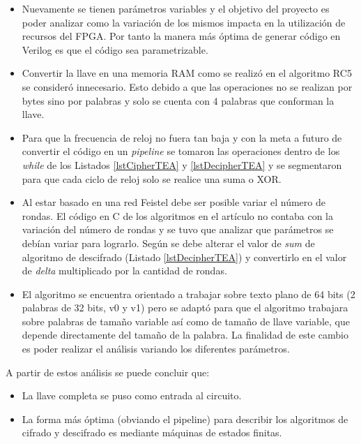 \begin{itemize}
\item Nuevamente se tienen parámetros variables y el objetivo del proyecto es poder analizar como la variación de los mismos impacta en la utilización de recursos del FPGA. Por tanto la manera más óptima de generar código en Verilog es que el código sea parametrizable.


\item Convertir la llave en una memoria RAM como se realizó en el algoritmo RC5 se consideró innecesario. Esto debido a que las operaciones no se realizan por bytes sino por palabras y solo se cuenta con 4 palabras que conforman la llave.

\item Para que la frecuencia de reloj no fuera tan baja y con la meta a futuro de convertir el código en un \textit{pipeline} se tomaron las operaciones dentro de los \textit{while} de los Listados \ref{lstCipherTEA} y \ref{lstDecipherTEA} y se segmentaron para que cada ciclo de reloj solo se realice una suma o XOR.

\item Al estar basado en una red Feistel debe ser posible variar el número de rondas. El código en C de los algoritmos en el artículo \citep{tea} no contaba con la variación del número de rondas y se tuvo que analizar que parámetros se debían variar para lograrlo. Según \cite{tea} se debe alterar el valor de \textit{sum} de algoritmo de descifrado (Listado \ref{lstDecipherTEA}) y convertirlo en el valor de \textit{delta} multiplicado por la cantidad de rondas.


\item El algoritmo se encuentra orientado a trabajar sobre texto plano de 64 bits (2 palabras de 32 bits, v0 y v1) pero se adaptó para que el algoritmo trabajara sobre palabras de tamaño variable así como de tamaño de llave variable, que depende directamente del tamaño de la palabra. La finalidad de este cambio es poder realizar el análisis variando los diferentes parámetros.
\end{itemize}


A partir de estos análisis se puede concluir que:
\begin{itemize}
\item La llave completa se puso como entrada al circuito.

\item La forma más óptima (obviando el pipeline) para describir los algoritmos de cifrado y descifrado es   mediante máquinas de estados finitas.
\end{itemize}

